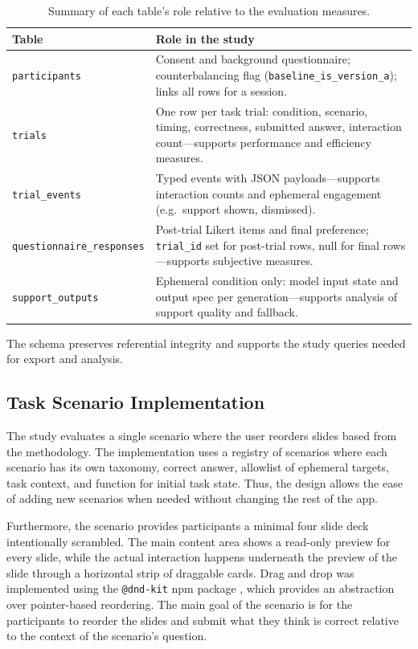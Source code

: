 \begin{table}[t]
    \centering
    \small
    \caption{Summary of each table's role relative to the evaluation measures.}
    \label{tab:schema}
    \begin{tabular}{@{}p{}p{}@{}}
        \toprule
        Table & Role in the study \\
        \midrule
        \texttt{participants} & Consent and background questionnaire; counterbalancing flag (\texttt{baseline\_is\_version\_a}); links all rows for a session. \\
        \texttt{trials} & One row per task trial: condition, scenario, timing, correctness, submitted answer, interaction count---supports performance and efficiency measures. \\
        \texttt{trial\_events} & Typed events with JSON payloads---supports interaction counts and ephemeral engagement (e.g.\ support shown, dismissed). \\
        \texttt{questionnaire\_responses} & Post-trial Likert items and final preference; \texttt{trial\_id} set for post-trial rows, null for final rows---supports subjective measures. \\
        \texttt{support\_outputs} & Ephemeral condition only: model input state and output spec per generation---supports analysis of support quality and fallback. \\
        \bottomrule
    \end{tabular}
\end{table}

The schema preserves referential integrity and supports the study queries needed for export and analysis.

\subsection{Task Scenario Implementation}

The study evaluates a single scenario where the user reorders slides based from the methodology. The implementation uses a registry of scenarios where each scenario has its own taxonomy, correct answer, allowlist of ephemeral targets, task context, and function for initial task state. Thus, the design allows the ease of adding new scenarios when needed without changing the rest of the app.

Furthermore, the scenario provides participants a minimal four slide deck intentionally scrambled. The main content area shows a read-only preview for every slide, while the actual interaction happens underneath the preview of the slide through a horizontal strip of draggable cards. Drag and drop was implemented using the \texttt{@dnd-kit} npm package \parencite{DndKit}, which provides an abstraction over pointer-based reordering. The main goal of the scenario is for the participants to reorder the slides and submit what they think is correct relative to the context of the scenario's question.

